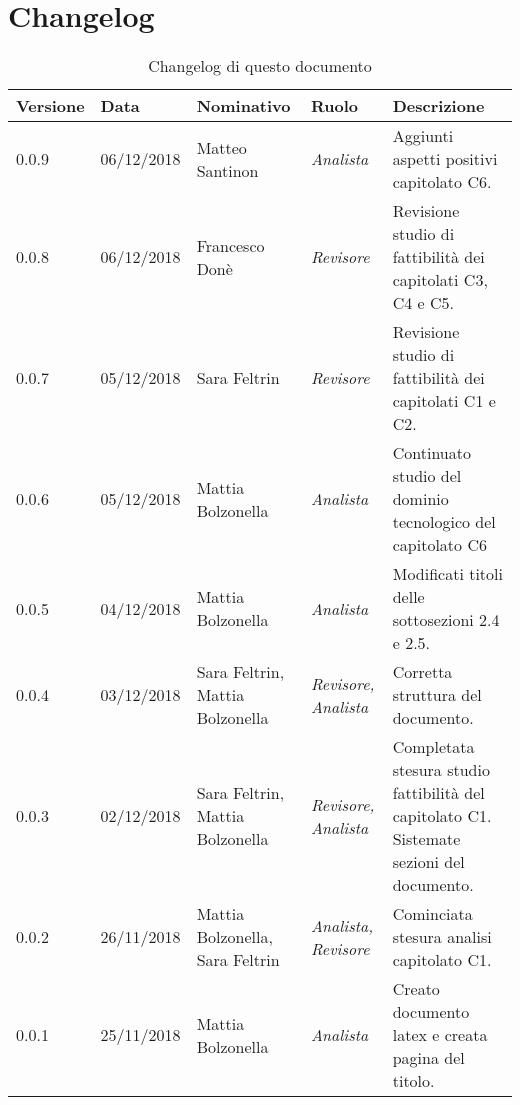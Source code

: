 \section{Changelog}
\begin{table}[tbph]
        \centering
        \begin{tabularx}{\textwidth}{|l|l|l|l|X|}
                \hline
                \textbf{Versione} & \textbf{Data} & \textbf{Nominativo}  & \textbf{Ruolo} & 
                \textbf{Descrizione}\\
                \hline \hline
                0.0.9 & 06/12/2018 & Matteo Santinon & \textit{Analista} & 
              	Aggiunti aspetti positivi capitolato C6.\\
              	
              	\hline
              	0.0.8 & 06/12/2018 & Francesco Donè & \textit{Revisore} & 
              	Revisione studio di fattibilità dei capitolati C3, C4 e C5.\\
                
                \hline
                0.0.7 & 05/12/2018 & Sara Feltrin & \textit{Revisore} & 
                Revisione studio di fattibilità dei capitolati C1 e C2.\\
                
                \hline
                0.0.6 & 05/12/2018 & Mattia Bolzonella & \textit{Analista} & 
                Continuato studio del dominio tecnologico del capitolato C6\\
                
                \hline
                0.0.5 & 04/12/2018 & Mattia Bolzonella & \textit{Analista} & 
                Modificati titoli delle sottosezioni 2.4 e 2.5. \\
                
                \hline
                0.0.4 & 03/12/2018 & Sara Feltrin, Mattia Bolzonella 
                & \textit{Revisore, Analista} & Corretta struttura del documento. \\
                
                \hline
                0.0.3 & 02/12/2018 & Sara Feltrin, Mattia Bolzonella & \textit{Revisore, Analista}
                & Completata stesura studio fattibilità del capitolato C1.
                Sistemate sezioni del documento. \\
                
                \hline
                0.0.2 & 26/11/2018 & Mattia Bolzonella, Sara Feltrin & \textit{Analista, Revisore}
                & Cominciata stesura analisi capitolato C1.\\

                \hline
                0.0.1 & 25/11/2018 & Mattia Bolzonella & \textit{Analista}
                & Creato documento latex e creata pagina del titolo.\\
                
                \hline
                
        \end{tabularx}
        \caption{Changelog di questo documento}
\end{table}